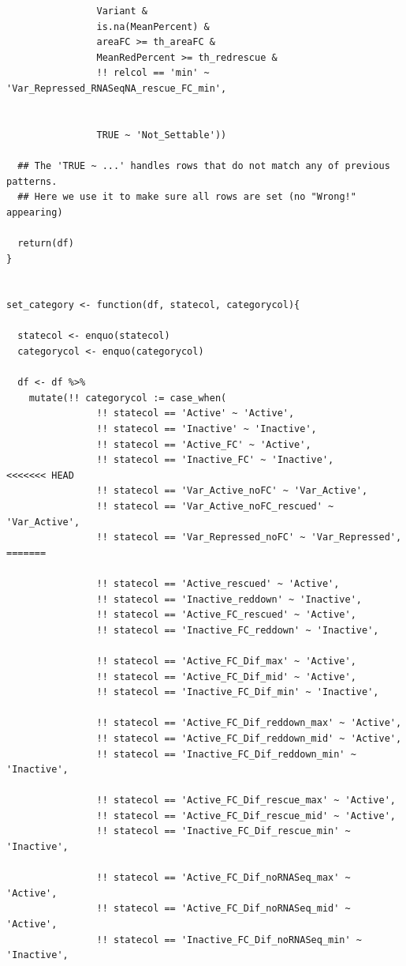 \documentclass[11pt]{article}
\begin{document}
\begin{verbatim}
                Variant &
                is.na(MeanPercent) &
                areaFC >= th_areaFC &
                MeanRedPercent >= th_redrescue &
                !! relcol == 'min' ~ 'Var_Repressed_RNASeqNA_rescue_FC_min',


                TRUE ~ 'Not_Settable'))

  ## The 'TRUE ~ ...' handles rows that do not match any of previous patterns.
  ## Here we use it to make sure all rows are set (no "Wrong!" appearing)

  return(df)
}


set_category <- function(df, statecol, categorycol){

  statecol <- enquo(statecol)
  categorycol <- enquo(categorycol)

  df <- df %>%
    mutate(!! categorycol := case_when(
                !! statecol == 'Active' ~ 'Active',
                !! statecol == 'Inactive' ~ 'Inactive',
                !! statecol == 'Active_FC' ~ 'Active',
                !! statecol == 'Inactive_FC' ~ 'Inactive',
<<<<<<< HEAD
                !! statecol == 'Var_Active_noFC' ~ 'Var_Active',
                !! statecol == 'Var_Active_noFC_rescued' ~ 'Var_Active',
                !! statecol == 'Var_Repressed_noFC' ~ 'Var_Repressed',
=======

                !! statecol == 'Active_rescued' ~ 'Active',
                !! statecol == 'Inactive_reddown' ~ 'Inactive',
                !! statecol == 'Active_FC_rescued' ~ 'Active',
                !! statecol == 'Inactive_FC_reddown' ~ 'Inactive',

                !! statecol == 'Active_FC_Dif_max' ~ 'Active',
                !! statecol == 'Active_FC_Dif_mid' ~ 'Active',
                !! statecol == 'Inactive_FC_Dif_min' ~ 'Inactive',

                !! statecol == 'Active_FC_Dif_reddown_max' ~ 'Active',
                !! statecol == 'Active_FC_Dif_reddown_mid' ~ 'Active',
                !! statecol == 'Inactive_FC_Dif_reddown_min' ~ 'Inactive',

                !! statecol == 'Active_FC_Dif_rescue_max' ~ 'Active',
                !! statecol == 'Active_FC_Dif_rescue_mid' ~ 'Active',
                !! statecol == 'Inactive_FC_Dif_rescue_min' ~ 'Inactive',

                !! statecol == 'Active_FC_Dif_noRNASeq_max' ~ 'Active',
                !! statecol == 'Active_FC_Dif_noRNASeq_mid' ~ 'Active',
                !! statecol == 'Inactive_FC_Dif_noRNASeq_min' ~ 'Inactive',



\end{verbatim}
\end{document}
